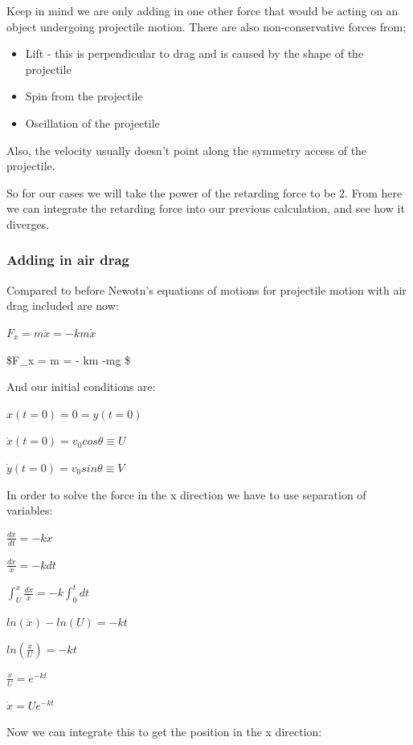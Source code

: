 \documentclass[11pt]{article}
\providecommand{\tightlist}{%
      \setlength{\itemsep}{0pt}\setlength{\parskip}{0pt}}
\begin{document}
Keep in mind we are only adding in one other force that would be acting
on an object undergoing projectile motion. There are also
non-conservative forces from;

\begin{itemize}
\tightlist
\item
  Lift - this is perpendicular to drag and is caused by the shape of the
  projectile
\item
  Spin from the projectile
\item
  Oscillation of the projectile
\end{itemize}

Also, the velocity usually doesn't point along the symmetry access of
the projectile.

So for our cases we will take the power of the retarding force to be 2.
From here we can integrate the retarding force into our previous
calculation, and see how it diverges.

    \hypertarget{adding-in-air-drag}{%
\subsubsection{Adding in air drag}\label{adding-in-air-drag}}

Compared to before Newotn's equations of motions for projectile motion
with air drag included are now:

\(F_x = m \ddot{x} = -km\dot{x}\)

\$F\_x = m  = - km -mg \$

And our initial conditions are:

\(x(t = 0) = 0 = y(t = 0)\)

\(\dot{x}(t = 0) = v_0 cos\theta \equiv U\)

\(\dot{y}(t = 0) = v_0 sin\theta \equiv V\)

In order to solve the force in the x direction we have to use separation
of variables:

\(\frac{d\dot{x}}{dt} = -k\dot{x}\)

\(\frac{d\dot{x}}{\dot{x}} = -kdt\)

\(\int_{U}^{\dot{x}} \frac{d\dot{x}}{\dot{x}} = -k\int_{0}^{t}dt\)

\(ln(\dot{x}) - ln(U) = -kt\)

\(ln(\frac{\dot{x}}{U}) = -kt\)

\(\frac{\dot{x}}{U} = e^{-kt}\)

\(\dot{x} = Ue^{-kt}\)

Now we can integrate this to get the position in the x direction:
\end{document}
